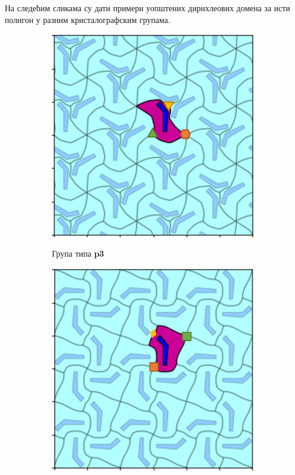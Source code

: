 \documentclass[12pt]{article}
\begin{document}
\begin{samepage}
 На следећим сликама су дати примери уопштених дирихлеових домена за исти полигон у разним кристалографским групама.
 \begin{figure}[H]

  \begin{subfigure}[b]{0.32\textwidth}
    \includegraphics[width=.95\textwidth]{gotovo_p3.png}
    \label{fig:f20}
    \caption{Група типа \textbf{p3}}
  \end{subfigure}
  \begin{subfigure}[b]{0.32\textwidth}
    \includegraphics[width=.95\textwidth]{gotovo_p4.png}

\end{subfigure}
\end{figure}
\end{samepage}
\end{document}
